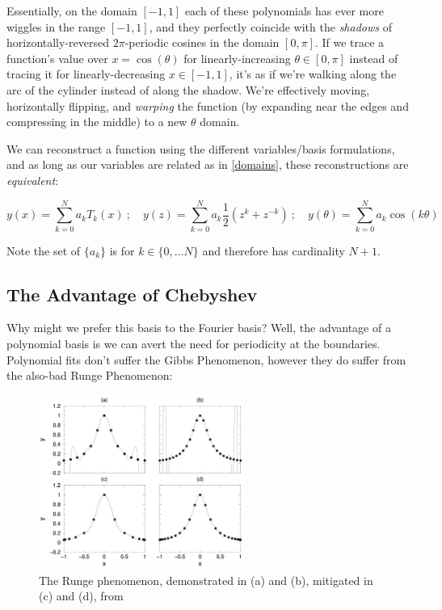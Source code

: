 \documentclass[10pt]{article}
\begin{document}
Essentially, on the domain $[-1, 1]$ each of these polynomials has ever more wiggles in the range $[-1, 1]$, and they perfectly coincide with the \textit{shadows} of horizontally-reversed $2\pi$-periodic cosines in the domain $[0, \pi]$. If we trace a function's value over $x = \cos(\theta)$ for linearly-increasing $\theta \in [0, \pi]$ instead of tracing it for linearly-decreasing $x \in [-1, 1]$, it's as if we're walking along the arc of the cylinder instead of along the shadow. We're effectively moving, horizontally flipping, and \textit{warping} the function (by expanding near the edges and compressing in the middle) to a new $\theta$ domain.

We can reconstruct a function using the different variables/basis formulations, and as long as our variables are related as in \autoref{domains}, these reconstructions are \textit{equivalent}:

\begin{equation}\label{equivalent}
y(x) = \sum_{k=0}^N a_k T_k(x)\ ;\quad y(z) = \sum_{k=0}^N a_k \frac{1}{2}(z^k + z^{-k})\ ;\quad y(\theta) = \sum_{k=0}^N a_k \cos(k \theta)
\end{equation}

Note the set of $\{a_k\}$ is for $k \in \{0, ... N\}$ and therefore has cardinality $N+1$.

\subsection{The Advantage of Chebyshev}

Why might we prefer this basis to the Fourier basis? Well, the advantage of a polynomial basis is we can avert the need for periodicity at the boundaries. Polynomial fits don't suffer the Gibbs Phenomenon, however they do suffer from the also-bad Runge Phenomenon\cite{kutz}:

\begin{figure}[h!]
	\centering
	\includegraphics[width=0.6\textwidth]{runge.png}
	\captionsetup{width=0.6\textwidth}
	\caption*{The Runge phenomenon, demonstrated in (a) and (b), mitigated in (c) and (d), from \cite{kutz}}
\end{figure}
\end{document}
